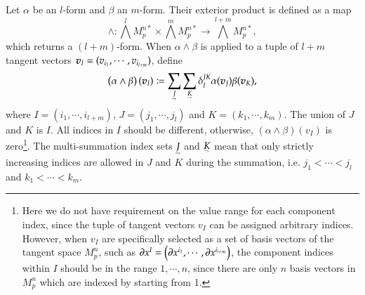 \documentclass[11pt, a4paper]{book}
\begin{document}
\begin{Definition}
  \label{def:exterior-product}
  Let $\alpha$ be an $l$-form and $\beta$ an $m$-form. Their exterior product is defined
  as a map
  \begin{equation}
    \wedge: \bigwedge^l M_p^{n*} \times \bigwedge^m M_p^{n*} \rightarrow
    \bigwedge^{l+m} M_p^{n*},
  \end{equation}
  which returns a $(l+m)$-form. When $\alpha \wedge \beta$ is applied to a tuple of $l+m$
  tangent vectors $\boldsymbol{v}_I = (v_{i_1}, \cdots, v_{i_{l+m}})$, define
  \begin{equation}
    \label{eq:exterior-product-applied-to-vectors}
    \left( \alpha\wedge\beta \right)(\vect{v}_I) \coloneqq
    \sum_{\underaccent{\rightharpoondown}{J}}
    \sum_{\underaccent{\rightharpoondown}{K}} \delta_I^{JK}
    \alpha(\vect{v}_J)\beta(\vect{v}_K),
  \end{equation}
  where $I = (i_1,\cdots,i_{l+m})$, $J = (j_1, \cdots, j_l)$ and $K = (k_1, \cdots, k_m)$.
  The union of $J$ and $K$ is $I$. All indices in $I$ should be different, otherwise,
  $\left( \alpha\wedge\beta \right)(v_I)$ is zero\footnote{Here we do not have requirement
    on the value range for each component index, since the tuple of tangent vectors $v_I$
    can be assigned arbitrary indices. However, when $v_I$ are specifically selected as a
    set of basis vectors of the tangent space $M_p^n$, such as
    $\boldsymbol{\partial}x^I = \left( \boldsymbol{\partial}x^{i_1},\cdots,\boldsymbol{\partial}x^{i_{l+m}}
    \right)$, the component indices within $I$ should be in the range $1,\cdots,n$, since
    there are only $n$ basis vectors in $M_p^n$ which are indexed by starting from
    1.\label{fn:index-value-range-in-exterior-form}}. The multi-summation index sets
  $\underaccent{\rightharpoondown}{J}$ and $\underaccent{\rightharpoondown}{K}$ mean that
  only strictly increasing indices are allowed in $J$ and $K$ during the summation, i.e.
  $j_1 < \cdots < j_{l}$ and $k_1 < \cdots < k_m$.
\end{Definition}
\end{document}
